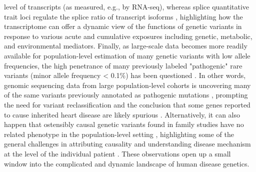 \documentclass[letter]{bioinfo}
\begin{document}
level of transcripts (as measured, e.g., by RNA-seq), whereas splice quantitative trait loci regulate the splice ratio of transcript isoforms \citep{Lau:2018:Omics}, highlighting how the transcriptome can offer a dynamic view of the functions of genetic variants in response to various acute and cumulative exposures including genetic, metabolic, and environmental mediators.  Finally, as large-scale data becomes more readily available for population-level estimation of many genetic variants with low allele frequencies, the high penetrance of many previously labeled "pathogenic" rare variants (minor allele frequency < 0.1\%) has been questioned \citep{Lek:2016:Analysis}.  In other words, genomic sequencing data from large population-level cohorts is uncovering many of the same variants previously annotated as pathogenic mutations \citep{Lek:2016:Analysis,Walsh:2017:Reassessment}, prompting the need for variant reclassification and the conclusion that some genes reported to cause inherited heart disease are likely spurious \citep{Macrae:2017:Closing}. Alternatively, it can also happen that ostensibly causal genetic variants found in family studies have no related phenotype in the population-level setting \citep{Manrai:2016:Clinical}, highlighting some of the general challenges in attributing causality and understanding disease mechanism at the level of the individual patient \citep{Macrae:2017:Closing}.  These observations open up a small window into the complicated and dynamic landscape of human disease genetics.  
\end{document}
